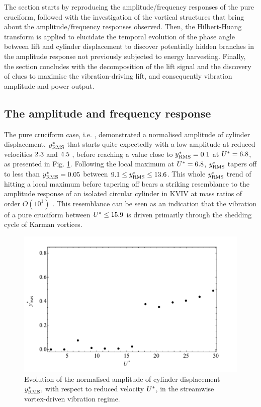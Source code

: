 \documentclass[oneside]{utmthesis}
\begin{document}
The section starts by reproducing the amplitude/frequency responses of the pure cruciform, followed with the investigation of the vortical structures that bring about the amplitude/frequency responses observed. Then, the Hilbert-Huang transform is applied to elucidate the temporal evolution of the phase angle between lift and cylinder displacement to discover potentially hidden branches in the amplitude response not previously subjected to energy harvesting. Finally, the section concludes with the decomposition of the lift signal and the discovery of clues to maximise the vibration-driving lift, and consequently vibration amplitude and power output.

\subsection{The amplitude and frequency response}\label{ssec:svivRegimeAmpFreqResp}

The pure cruciform case, i.e. \angfi{}, demonstrated a normalised \rms{} amplitude of cylinder displacement, $y^{*}_{\text{RMS}}$ that starts quite expectedly with a low amplitude at reduced velocities $2.3$ and $4.5$ , before reaching a value close to $y^{*}_{\text{RMS}} = 0.1$ at $U^{*} = 6.8$, as presented in Fig. \ref{fig:yStrRMS1}. Following the local maximum at $U^{*} = 6.8$, $y^{*}_{\text{RMS}}$ tapers off to less than $y^{*}_{\text{RMS}} = 0.05$ between $9.1 \leq y^{*}_{\text{RMS}} \leq 13.6$. This whole $y^{*}_{\text{RMS}}$ trend of hitting a local maximum before tapering off bears a striking resemblance to the amplitude response of an isolated circular cylinder in KVIV at mass ratios of order $O(10^{1})$ \citep{Feng1963,Khalak1999}. This resemblance can be seen as an indication that the vibration of a pure cruciform between $U^{*} \leq 15.9$ is driven primarily through the shedding cycle of Karman vortices.

\begin{figure}
  \centering
  \includegraphics[width=1\textwidth]{figs/yStrRMS1}
  \caption{Evolution of the normalised \rms{} amplitude of cylinder displacement $y^{*}_{\text{RMS}}$, with respect to reduced velocity $U^{*}$, in the streamwise vortex-driven vibration regime.} \label{fig:yStrRMS1}
\end{figure}
\end{document}
